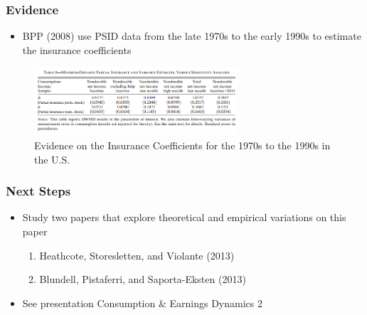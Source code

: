 \begin{frame}
	\frametitle{Evidence}
		\begin{itemize}
			\item BPP (2008) use PSID data from the late 1970s to the early 1990s to estimate the insurance coefficients 
		\end{itemize}

\begin{center}
\begin{figure}[H]
\caption*{Evidence on the Insurance Coefficients for the 1970s to the 1990s in the U.S.}
\centering
\includegraphics[width=3in, height=1in]{Table8BPP_2008.png}
\end{figure}
\end{center}	

\end{frame}

\begin{frame}
	\frametitle{Next Steps}
		\begin{itemize}
			\item Study two papers that explore theoretical and empirical variations on this paper
				\begin{enumerate}
					\item Heathcote, Storesletten, and Violante (2013)
					\item Blundell, Pistaferri, and Saporta-Eksten (2013)
				\end{enumerate}
			\item See presentation Consumption \& Earnings Dynamics 2
		\end{itemize}

\end{frame}





